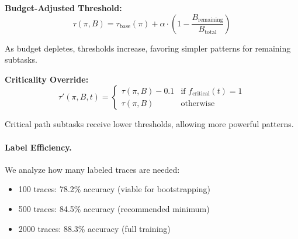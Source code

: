 \documentclass{article}
\theoremstyle{plain}
\theoremstyle{definition}
\theoremstyle{remark}
\begin{document}
\textbf{Budget-Adjusted Threshold:}
\begin{equation}
	\tau(\pi, B) = \tau_{\text{base}}(\pi) + \alpha \cdot \left(1 - \frac{B_{\text{remaining}}}{B_{\text{total}}}\right)
\end{equation}

As budget depletes, thresholds increase, favoring simpler patterns for remaining subtasks.

\textbf{Criticality Override:}
\begin{equation}
	\tau'(\pi, B, t) = \begin{cases}
		\tau(\pi, B) - 0.1 & \text{if } f_{\text{critical}}(t) = 1 \\
		\tau(\pi, B) & \text{otherwise}
	\end{cases}
\end{equation}

Critical path subtasks receive lower thresholds, allowing more powerful patterns.

%
%

\paragraph{Label Efficiency.}
We analyze how many labeled traces are needed:
\begin{itemize}[nosep,leftmargin=*]
	\item 100 traces: 78.2\% accuracy (viable for bootstrapping)
	\item 500 traces: 84.5\% accuracy (recommended minimum)
	\item 2000 traces: 88.3\% accuracy (full training)
\end{itemize}
\end{document}
